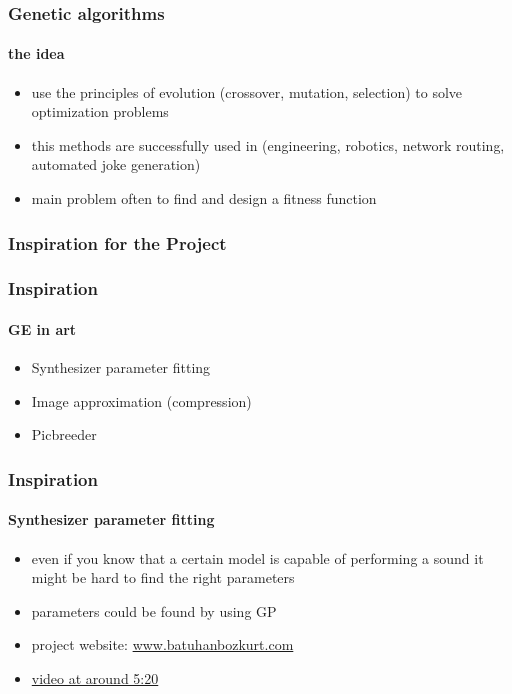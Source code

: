 \documentclass{beamer}
\begin{document}
\begin{frame}
	\frametitle{Genetic algorithms}
	\framesubtitle{the idea}
	
	\begin{itemize}
		\item<1-> use the principles of evolution (crossover, mutation, selection)
		to solve optimization problems
		\item<2-> this methods are successfully used in (engineering, robotics, network routing,
		automated joke generation) 
		\item<3-> main problem often to find and design a fitness function
	\end{itemize}
\end{frame}


\subsubsection{Inspiration for the Project} %
\label{sg:ssub:inspiration_for_the_project}

\begin{frame}
	\frametitle{Inspiration}
	\framesubtitle{GE in art}
	
	\begin{itemize}
		\item<1-> Synthesizer parameter fitting
		\item<2-> Image approximation (compression)
		\item<3-> Picbreeder
	\end{itemize}
\end{frame}

\begin{frame}
	\frametitle{Inspiration}
	\framesubtitle{Synthesizer parameter fitting}

	\begin{itemize}
		\item<1-> even if you know that a certain model is capable of performing a sound
		it might be hard to find the right parameters
		\item<2-> parameters could be found by using GP
		\item<3-> project website: \href{http://www.batuhanbozkurt.com/news/naturetoolkit-update-genetic-algorithms-and-parameter-estimation-for-supercollider}{www.batuhanbozkurt.com}
		\item<4-> \href{http://vimeo.com/7908757}{video at around 5:20}
	\end{itemize}
\end{frame}
\end{document}
